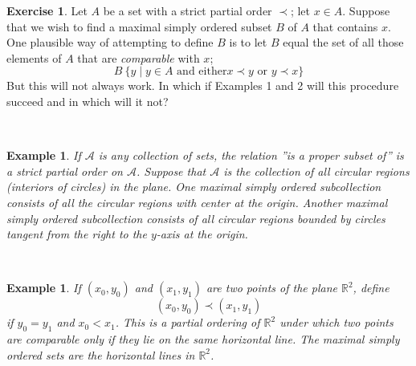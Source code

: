 \documentclass[11pt,a4paper,twoside]{article}
\theoremstyle{definition}
\newcounter{excounter}
\newtheorem{exercise}[excounter]{Exercise}
\newcounter{examplecounter}
\theoremstyle{plain}
\newtheorem{example}[examplecounter]{Example}
\begin{document}
\begin{exercise}

  Let $A$ be a set with a strict partial order $\prec$; let $x \in A$. Suppose that we wish to find
  a maximal simply ordered subset $B$ of $A$ that contains $x$. One plausible way of attempting to
  define $B$ is to let $B$ equal the set of all those elements of $A$ that are \emph{comparable} with $x$;
  \begin{equation*}
    B ~ \{ y \mid y \in A \text{ and either} x \prec y \text{ or } y \prec x \}
  \end{equation*}
  But this will not always work. In which if Examples 1 and 2 will this procedure succeed and in which
  will it not?

\end{exercise}

~\\
\begin{example}
  If $\mathscr{A}$ is any collection of sets, the relation ''is a proper subset of'' is a strict partial order on $\mathscr{A}$.
  Suppose that $\mathscr{A}$ is the collection of all circular regions (interiors of circles) in the plane. One maximal
  simply ordered subcollection consists of all the circular regions with center at the origin. Another maximal simply ordered
  subcollection consists of all circular regions bounded by circles tangent from the right to the $y$-axis at the origin.
\end{example}

~\\
\begin{example}
  If $( x_0, y_0 )$ and $( x_1, y_1 )$ are two points of the plane $\mathbb{R}^2$, define
  \begin{equation*}
    ( x_0, y_0 ) \prec ( x_1, y_1 )
  \end{equation*}
  if $y_0 = y_1$ and $x_0 < x_1$. This is a partial ordering of $\mathbb{R}^2$ under which two points are comparable only if
  they lie on the same horizontal line. The maximal simply ordered sets are the horizontal lines in $\mathbb{R}^2$.
\end{example}
\end{document}
